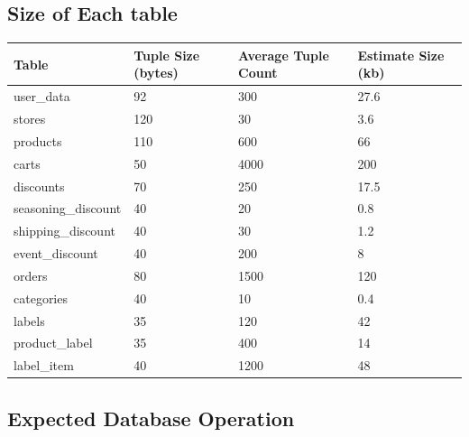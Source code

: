\documentclass[a4paper, 12pt]{article}
\begin{document}
\newpage

\subsection{Size of Each table}

\noindent\begin{tabular}{ | p{8em} | p{6.5em} | p{6.5em} | p{8em} |}
  \hline 
  Table & Tuple Size (bytes) & Average Tuple Count & Estimate Size (kb) \\
  \hline
  user_data & 92 & 300 & 27.6 \\
  \hline
  stores & 120 & 30 & 3.6 \\
  \hline
  products & 110 & 600 & 66 \\
  \hline
  carts & 50 & 4000 & 200 \\
  \hline
  discounts & 70 & 250 & 17.5 \\
  \hline
  seasoning_discount & 40 & 20 & 0.8 \\
  \hline
  shipping_discount & 40 & 30 & 1.2 \\
  \hline
  event_discount & 40 & 200 & 8 \\
  \hline
  orders & 80 & 1500 & 120 \\
  \hline
  categories & 40 & 10 & 0.4 \\
  \hline
  labels & 35 & 120 & 42 \\
  \hline
  product_label & 35 & 400 & 14 \\
  \hline
  label_item & 40 & 1200 & 48 \\
  \hline
\end{tabular}

\subsection{Expected Database Operation}
\end{document}
